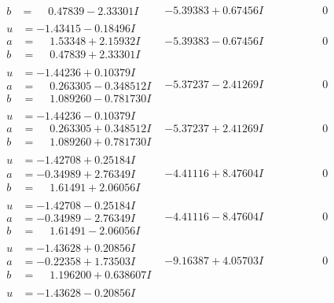 \documentclass[1p]{elsarticle_modified}
\theoremstyle{definition}
\begin{document}
$$\begin{array}{c|c|c}
\begin{aligned}
b &= \phantom{-}0.47839 - 2.33301 I\end{aligned}
 & -5.39383 + 0.67456 I & \phantom{-0.000000 } 0 \\ \hline\begin{aligned}
u &= -1.43415 - 0.18496 I \\
a &= \phantom{-}1.53348 + 2.15932 I \\
b &= \phantom{-}0.47839 + 2.33301 I\end{aligned}
 & -5.39383 - 0.67456 I & \phantom{-0.000000 } 0 \\ \hline\begin{aligned}
u &= -1.44236 + 0.10379 I \\
a &= \phantom{-}0.263305 - 0.348512 I \\
b &= \phantom{-}1.089260 - 0.781730 I\end{aligned}
 & -5.37237 - 2.41269 I & \phantom{-0.000000 } 0 \\ \hline\begin{aligned}
u &= -1.44236 - 0.10379 I \\
a &= \phantom{-}0.263305 + 0.348512 I \\
b &= \phantom{-}1.089260 + 0.781730 I\end{aligned}
 & -5.37237 + 2.41269 I & \phantom{-0.000000 } 0 \\ \hline\begin{aligned}
u &= -1.42708 + 0.25184 I \\
a &= -0.34989 + 2.76349 I \\
b &= \phantom{-}1.61491 + 2.06056 I\end{aligned}
 & -4.41116 + 8.47604 I & \phantom{-0.000000 } 0 \\ \hline\begin{aligned}
u &= -1.42708 - 0.25184 I \\
a &= -0.34989 - 2.76349 I \\
b &= \phantom{-}1.61491 - 2.06056 I\end{aligned}
 & -4.41116 - 8.47604 I & \phantom{-0.000000 } 0 \\ \hline\begin{aligned}
u &= -1.43628 + 0.20856 I \\
a &= -0.22358 + 1.73503 I \\
b &= \phantom{-}1.196200 + 0.638607 I\end{aligned}
 & -9.16387 + 4.05703 I & \phantom{-0.000000 } 0 \\ \hline\begin{aligned}
u &= -1.43628 - 0.20856 I \\

\end{aligned}
\end{array}$$
\end{document}

